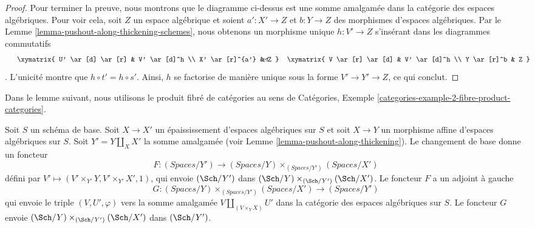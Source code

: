 \begin{proof}
\medskip\noindent
Pour terminer la preuve, nous montrons que le diagramme ci-dessus est une somme amalgamée dans la catégorie des espaces algébriques. Pour voir cela, soit $Z$ un espace algébrique et soient $a' : X' \to Z$ et $b : Y \to Z$ des morphismes d'espaces algébriques. Par le Lemme \ref{lemma-pushout-along-thickening-schemes}, nous obtenons un morphisme unique $h : V' \to Z$ s'insérant dans les diagrammes commutatifs $$
\vcenter{
\xymatrix{
U' \ar[d] \ar[r] & V' \ar[d]^h \\
X' \ar[r]^{a'} & Z
}
}
\quad\text{et}\quad
\vcenter{
\xymatrix{
V \ar[r] \ar[d] & V' \ar[d]^h \\
Y \ar[r]^b & Z
}
}
$$. L'unicité montre que $h \circ t' = h \circ s'$. Ainsi, $h$ se factorise de manière unique sous la forme $V' \to Y' \to Z$, ce qui conclut.
\end{proof}

\noindent
Dans le lemme suivant, nous utilisons le produit fibré de catégories au sens de
Catégories, Exemple \ref{categories-example-2-fibre-product-categories}.

\begin{lemma}
\label{lemma-categories-spaces-over-pushout}
Soit $S$ un schéma de base. Soit $X \to X'$ un épaississement d'espaces algébriques sur $S$ et soit $X \to Y$ un morphisme affine d'espaces algébriques sur $S$.
Soit $Y' = Y \amalg_X X'$ la somme amalgamée (voir
Lemme \ref{lemma-pushout-along-thickening}). Le changement de base donne un foncteur
$$
F :
(\textit{Spaces}/Y')
\longrightarrow
(\textit{Spaces}/Y) \times_{(\textit{Spaces}/Y')} (\textit{Spaces}/X')
$$
défini par $V' \longmapsto (V' \times_{Y'} Y, V' \times_{Y'} X', 1)$, qui
envoie $(\Sch/Y')$ dans $(\Sch/Y) \times_{(\Sch/Y')} (\Sch/X')$.
Le foncteur $F$ a un adjoint à gauche
$$
G :
(\textit{Spaces}/Y) \times_{(\textit{Spaces}/Y')} (\textit{Spaces}/X')
\longrightarrow
(\textit{Spaces}/Y')
$$
qui envoie le triple $(V, U', \varphi)$ vers la somme amalgamée
$V \amalg_{(V \times_Y X)} U'$ dans la catégorie des espaces algébriques sur $S$.
Le foncteur $G$ envoie $(\Sch/Y) \times_{(\Sch/Y')} (\Sch/X')$ dans $(\Sch/Y')$.
\end{lemma}

